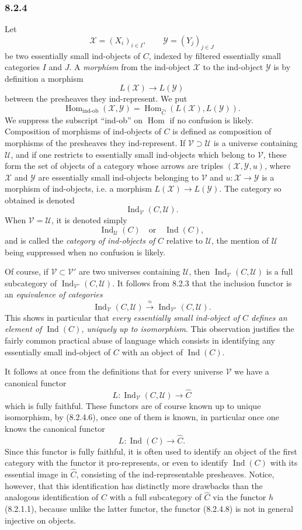 \documentclass[11pt]{article}
\newcommand{\U}{\mathcal{U}}
\newcommand{\V}{\mathcal{V}}
\newcommand{\Hom}{\operatorname{Hom}}
\newcommand{\Ind}{\operatorname{Ind}}
\begin{document}
\subsubsection*{8.2.4}
Let
\[
\mathcal X=(X_i)_{i\in I},\qquad \mathcal Y=(Y_j)_{j\in J}
\tag{8.2.4.1}
\]
be two essentially small ind-objects of $C$, indexed by filtered essentially small categories $I$ and $J$. A \emph{morphism} from the ind-object $\mathcal X$ to the ind-object $\mathcal Y$ is by definition a morphism
\[
L(\mathcal X)\longrightarrow L(\mathcal Y)
\tag{8.2.4.2}
\]
between the presheaves they ind-represent. We put
\[
\Hom_{\text{ind-ob}}(\mathcal X,\mathcal Y)
=\Hom_{\widehat C}(L(\mathcal X),L(\mathcal Y)).
\tag{8.2.4.3}
\]
We suppress the subscript ``ind-ob'' on $\Hom$ if no confusion is likely. Composition of morphisms of ind-objects of $C$ is defined as composition of morphisms of the presheaves they ind-represent. If $\V\supset\U$ is a universe containing $\U$, and if one restricts to essentially small ind-objects which belong to $\V$, these form the set of objects of a category whose arrows are triples $(\mathcal X,\mathcal Y,u)$, where $\mathcal X$ and $\mathcal Y$ are essentially small ind-objects belonging to $\V$ and $u:\mathcal X\to\mathcal Y$ is a morphism of ind-objects, i.e. a morphism $L(\mathcal X)\to L(\mathcal Y)$. The category so obtained is denoted
\[
\Ind_{\V}(C,\U).
\tag{8.2.4.4}
\]
When $\V=\U$, it is denoted simply
\[
\Ind_{\U}(C)\quad\text{or}\quad\Ind(C),
\tag{8.2.4.5}
\]
and is called the \emph{category of ind-objects of} $C$ relative to $\U$, the mention of $\U$ being suppressed when no confusion is likely.

Of course, if $\V\subset\V'$ are two universes containing $\U$, then $\Ind_{\V}(C,\U)$ is a full subcategory of $\Ind_{\V'}(C,\U)$. It follows from 8.2.3 that the inclusion functor is an \emph{equivalence of categories}
\[
\Ind_{\V}(C,\U)\xrightarrow{\approx}\Ind_{\V'}(C,\U).
\tag{8.2.4.6}
\]
This shows in particular that \emph{every essentially small ind-object of $C$ defines an element of $\Ind(C)$, uniquely up to isomorphism}. This observation justifies the fairly common practical abuse of language which consists in identifying any essentially small ind-object of $C$ with an object of $\Ind(C)$.

It follows at once from the definitions that for every universe $\V$ we have a canonical functor
\[
L:\Ind_{\V}(C,\U)\longrightarrow \widehat C
\tag{8.2.4.7}
\]
which is fully faithful. These functors are of course known up to unique isomorphism, by (8.2.4.6), once one of them is known, in particular once one knows the canonical functor
\[
L:\Ind(C)\longrightarrow \widehat C.
\tag{8.2.4.8}
\]
Since this functor is fully faithful, it is often used to identify an object of the first category with the functor it pro-represents, or even to identify $\Ind(C)$ with its essential image in $\widehat C$, consisting of the ind-representable presheaves. Notice, however, that this identification has distinctly more drawbacks than the analogous identification of $C$ with a full subcategory of $\widehat C$ via the functor $h$ (8.2.1.1), because unlike the latter functor, the functor (8.2.4.8) is not in general injective on objects.
\end{document}
